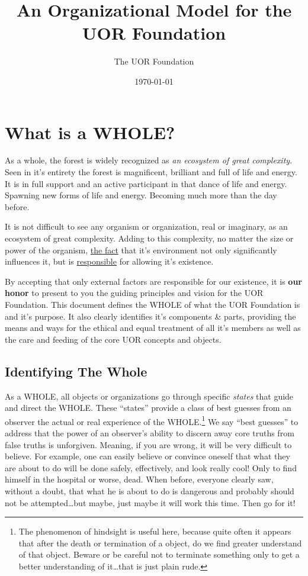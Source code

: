 \documentclass[twocolumn,10pt]{article}
\title{An Organizational Model for the UOR Foundation}
\author{The UOR Foundation}
\date{\today}
\begin{document}

\section*{What is a WHOLE?}
As a whole, the forest is widely recognized as \textit{an ecosystem of great complexity}.
Seen in it's entirety the forest is magnificent, brilliant and full of life and energy.
It is in full support and an active participant in that dance of life and energy.
Spawning new forms of life and energy.
Becoming much more than the day before.

It is not difficult to see any organism or organization, real or imaginary, as an ecosystem of great complexity.
Adding to this complexity,  no matter the size or power of the organism, \underline{the fact} that it's environment not only significantly influences it, but is \underline{responsible} for allowing it's existence.

By accepting that only external factors are responsible for our existence, it is \textbf{our honor} to present to you the guiding principles and vision for the UOR Foundation.
This document defines the WHOLE of what the UOR Foundation is and it's purpose.
It also clearly identifies it's components \& parts, providing the means and ways for the ethical and equal treatment of all it's members as well as the care and feeding of the core UOR concepts and objects.

\subsection*{Identifying The Whole}
As a WHOLE, all objects or organizations go through specific \textit{states} that guide and direct the WHOLE\@.
These ``states'' provide a class of best guesses from an observer the actual or real experience of the WHOLE\@.\footnote{The phenomenon of hindsight is useful here, because quite often it appears that after the death or termination of a object, do we find greater understand of that object.
Beware or be careful not to terminate something only to get a better understanding of it\ldots that is just plain rude.}
We say ``best guesses'' to address that the power of an observer's ability to discern away core truths from false truths is unforgiven.
Meaning, if you are wrong, it will be very difficult to believe.
For example, one can easily believe or convince oneself that what they are about to do will be done safely, effectively, and look really cool!
Only to find himself in the hospital or worse, dead.
When before, everyone clearly saw, without a doubt, that what he is about to do is dangerous and probably should not be attempted\ldots but maybe, just maybe it will work this time.
Then go for it!
\end{document}

